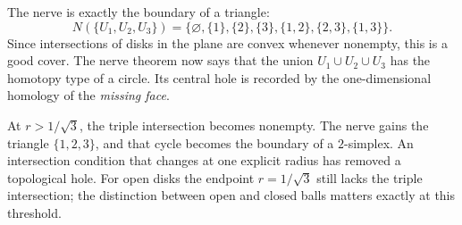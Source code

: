 The nerve is exactly the boundary of a triangle:
\[
 N(\{U_1,U_2,U_3\})=
 \{\varnothing,\{1\},\{2\},\{3\},
   \{1,2\},\{2,3\},\{1,3\}\}.
\]
Since intersections of disks in the plane are convex whenever nonempty, this is a good cover. The nerve theorem now says that the union $U_1\cup U_2\cup U_3$ has the homotopy type of a circle. Its central hole is recorded by the one-dimensional homology of the \emph{missing face}.

At $r>1/\sqrt3$, the triple intersection becomes nonempty. The nerve gains the triangle $\{1,2,3\}$, and that cycle becomes the boundary of a $2$-simplex. An intersection condition that changes at one explicit radius has removed a topological hole. For open disks the endpoint $r=1/\sqrt3$ still lacks the triple intersection; the distinction between open and closed balls matters exactly at this threshold.

